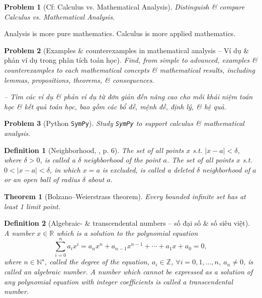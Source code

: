 \documentclass[oneside]{book}
\newtheorem{definition}{Definition}
\newtheorem{problem}{Problem}
\newtheorem{theorem}{Theorem}
\begin{document}
\begin{problem}[Cf: Calculus vs. Mathematical Analysis]
	Distinguish \& compare Calculus vs. Mathematical Analysis.
\end{problem}
Analysis is more pure mathematics. Calculus is more applied mathematics.

\begin{problem}[Examples \& counterexamples in mathematical analysis -- Ví dụ \& phản ví dụ trong phân tích toán học]
	Find, from simple to advanced, examples \& counterexamples to each mathematical concepts \& mathematical results, including lemmas, propositions, theorems, \& consequences.
	
	-- Tìm các ví dụ \& phản ví dụ từ đơn giản đến nâng cao cho mỗi khái niệm toán học \& kết quả toán học, bao gồm các bổ đề, mệnh đề, định lý, \& hệ quả.
\end{problem}

\begin{problem}[Python {\tt SymPy}]
	Study {\tt SymPy} to support calculus \& mathematical analysis.
\end{problem}

\begin{definition}[Neighborhood, \cite{Wrede_Spiegel2010}, p. 6]
	The set of all points $x$ s.t. $|x - a| < \delta$, where $\delta > 0$, is called a $\delta$ {\rm neighborhood} of the point $a$. The set of all points $x$ s.t. $0 < |x - a| < \delta$, in which $x = a$ is excluded, is called a {\rm deleted $\delta$ neighborhood} of $a$ or an open ball of radius $\delta$ about $a$.
\end{definition}

\begin{theorem}[Bolzano--Weierstrass theorem]
	Every bounded infinite set has at least 1 limit point.
\end{theorem}

\begin{definition}[Algebraic- \& transcendental numbers -- số đại số \& số siêu việt]
	A number $x\in\mathbb{R}$ which is a solution to the {\rm polynomial equation}
	\begin{equation}
		\label{polynomial eqn}
		\sum_{i=0}^n a_ix^i = a_nx^n + a_{n-1}x^{n-1} + \cdots + a_1x + a_0 = 0,
	\end{equation}
	where $n\in\mathbb{N}^\star$, called the {\rm degree} of the equation, $a_i\in\mathbb{Z}$, $\forall i = 0,1,\ldots,n$, $a_n\ne0$, is called an {\rm algebraic number}. A number which cannot be expressed as a solution of any polynomial equation with integer coefficients is called a {\rm transcendental number}.
\end{definition}
\end{document}
